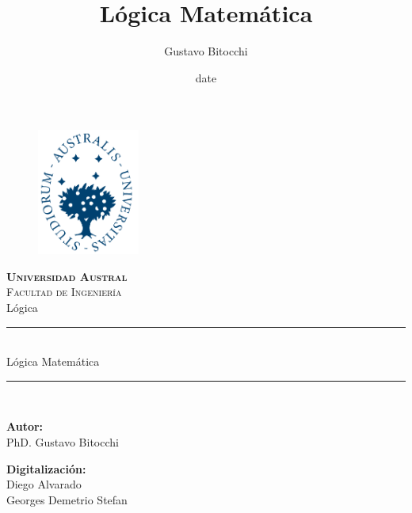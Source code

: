 \documentclass[12pt]{report}
\begin{document}
\title{Lógica Matemática}
\author{Gustavo Bitocchi}
\date{date}

\begin{titlepage}
\begin{figure}[t]
    \centering\includegraphics[width=0.3\textwidth]{SharedImages/logo.png}
\end{figure}
\begin{center}
    \textsc{ \LARGE \textbf{Universidad Austral}{ \\}}
	\textsc{ \LARGE{Facultad de Ingeniería \\ }}
	\textnormal{ \Large{Lógica \\}}
	\vspace{5mm}
	\fontsize{10mm}{10mm}\selectfont 
	 \rule[0.50]{9cm}{0.4pt}\\
    \textup{Lógica Matemática}\\    
    \rule[0.50\baselineskip]{9cm}{0.4pt}\\

    
\end{center}

\vspace{10mm}

\begin{minipage}[t]{0.47\textwidth}
	\textnormal{\large{\bf Autor: \\}}
	{\large PhD. Gustavo Bitocchi \\}
\end{minipage}\hfill\begin{minipage}[t]{0.47\textwidth}\raggedleft
	\textnormal{\large{\bf Digitalización: \\}}
	{\large Diego Alvarado\\ Georges Demetrio Stefan}
\end{minipage}

\vspace{20mm}


\end{titlepage}
\end{document}
